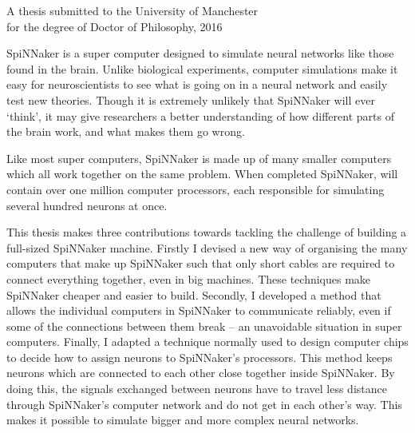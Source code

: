 {
	
	
	
	\vfill
	
	\begin{center}
		\textsc{\large\thesistitle}
		
		\vspace{0.5em}
		
		\thesisauthor
		
		\vspace{0.5em}
		
		A thesis submitted to the University of Manchester\\
		for the degree of Doctor of Philosophy, 2016
	\end{center}
	
	\vfill
	
	
	SpiNNaker is a super computer designed to simulate neural networks like those
	found in the brain. Unlike biological experiments, computer simulations make
	it easy for neuroscientists to see what is going on in a neural network and
	easily test new theories. Though it is extremely unlikely that SpiNNaker will
	ever `think', it may give researchers a better understanding of how different
	parts of the brain work, and what makes them go wrong.
	
	Like most super computers, SpiNNaker is made up of many smaller computers
	which all work together on the same problem. When completed SpiNNaker, will
	contain over one million computer processors, each responsible for simulating
	several hundred neurons at once.
	
	This thesis makes three contributions towards tackling the challenge of
	building a full-sized SpiNNaker machine. Firstly I devised a new way of
	organising the many computers that make up SpiNNaker such that only short
	cables are required to connect everything together, even in big machines.
	These techniques make SpiNNaker cheaper and easier to build.  Secondly, I
	developed a method that allows the individual computers in SpiNNaker to
	communicate reliably, even if some of the connections between them break --
	an unavoidable situation in super computers. Finally, I adapted a technique
	normally used to design computer chips to decide how to assign neurons to
	SpiNNaker's processors. This method keeps neurons which are connected to each
	other close together inside SpiNNaker. By doing this, the signals exchanged
	between neurons have to travel less distance through SpiNNaker's computer
	network and do not get in each other's way. This makes it possible to
	simulate bigger and more complex neural networks.
	
	\par%
}

